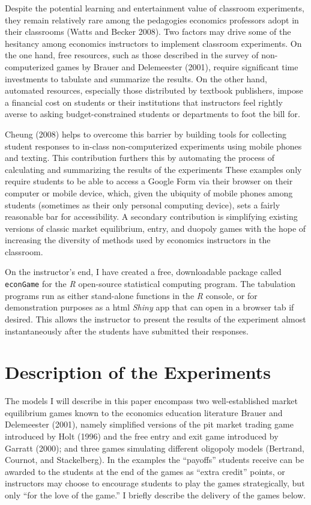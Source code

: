 \documentclass[
]{article}
\begin{document}
Despite the potential learning and entertainment value of classroom
experiments, they remain relatively rare among the pedagogies economics
professors adopt in their classrooms (Watts and Becker 2008). Two
factors may drive some of the hesitancy among economics instructors to
implement classroom experiments. On the one hand, free resources, such
as those described in the survey of non-computerized games by Brauer and
Delemeester (2001), require significant time investments to tabulate and
summarize the results. On the other hand, automated resources,
especially those distributed by textbook publishers, impose a financial
cost on students or their institutions that instructors feel rightly
averse to asking budget-constrained students or departments to foot the
bill for.

Cheung (2008) helps to overcome this barrier by building tools for
collecting student responses to in-class non-computerized experiments
using mobile phones and texting. This contribution furthers this by
automating the process of calculating and summarizing the results of the
experiments These examples only require students to be able to access a
Google Form via their browser on their computer or mobile device, which,
given the ubiquity of mobile phones among students (sometimes as their
only personal computing device), sets a fairly reasonable bar for
accessibility. A secondary contribution is simplifying existing versions
of classic market equilibrium, entry, and duopoly games with the hope of
increasing the diversity of methods used by economics instructors in the
classroom.

On the instructor's end, I have created a free, downloadable package
called \texttt{econGame} for the \emph{R} open-source statistical
computing program. The tabulation programs run as either stand-alone
functions in the \emph{R} console, or for demonstration purposes as a
html \emph{Shiny} app that can open in a browser tab if desired. This
allows the instructor to present the results of the experiment almost
instantaneously after the students have submitted their responses.

\hypertarget{description-of-the-experiments}{%
\section{Description of the
Experiments}\label{description-of-the-experiments}}

The models I will describe in this paper encompass two well-established
market equilibrium games known to the economics education literature
Brauer and Delemeester (2001), namely simplified versions of the pit
market trading game introduced by Holt (1996) and the free entry and
exit game introduced by Garratt (2000); and three games simulating
different oligopoly models (Bertrand, Cournot, and Stackelberg). In the
examples the ``payoffs'' students receive can be awarded to the students
at the end of the games as ``extra credit'' points, or instructors may
choose to encourage students to play the games strategically, but only
``for the love of the game.'' I briefly describe the delivery of the
games below.
\end{document}
